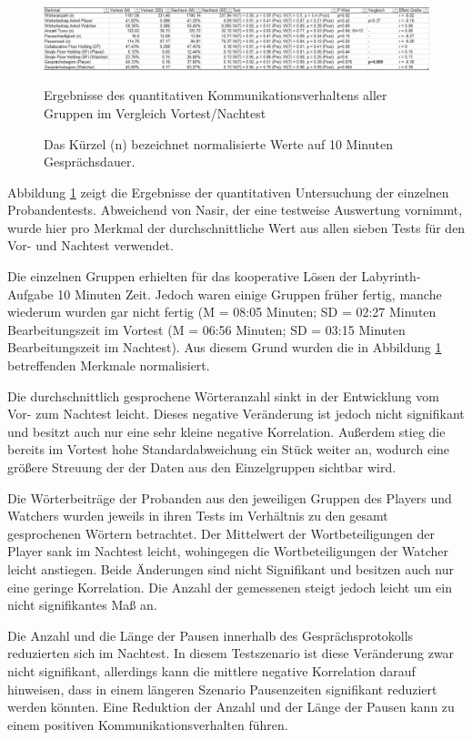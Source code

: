 \begin{figure}[ht]
\centering
\includegraphics[width=1\linewidth]{content/pictures/quantitative_communication_results.png}
\caption{Ergebnisse des quantitativen Kommunikationsverhaltens aller Gruppen im Vergleich Vortest/Nachtest}
\caption*{\footnotesize Das Kürzel (n) bezeichnet normalisierte Werte auf 10 Minuten Gesprächsdauer.}
\label{fig:communication-results}
\end{figure}

Abbildung \ref{fig:communication-results} zeigt die Ergebnisse der quantitativen Untersuchung der einzelnen Probandentests. Abweichend von Nasir, der eine testweise Auswertung vornimmt, wurde hier pro Merkmal der durchschnittliche Wert aus allen sieben Tests für den Vor- und Nachtest verwendet.

Die einzelnen Gruppen erhielten für das kooperative Lösen der Labyrinth-Aufgabe 10 Minuten Zeit. Jedoch waren einige Gruppen früher fertig, manche wiederum wurden gar nicht fertig (M = 08:05 Minuten; SD = 02:27 Minuten Bearbeitungszeit im Vortest (M = 06:56 Minuten; SD = 03:15 Minuten Bearbeitungszeit im Nachtest). Aus diesem Grund wurden die in Abbildung \ref{fig:communication-results} betreffenden Merkmale normalisiert.

Die durchschnittlich gesprochene Wörteranzahl sinkt in der Entwicklung vom Vor- zum Nachtest leicht. Dieses negative Veränderung ist jedoch nicht signifikant und besitzt auch nur eine sehr kleine negative Korrelation. Außerdem stieg die bereits im Vortest hohe Standardabweichung ein Stück weiter an, wodurch eine größere Streuung der der Daten aus den Einzelgruppen sichtbar wird. 

Die Wörterbeiträge der Probanden aus den jeweiligen Gruppen des Players und Watchers wurden jeweils in ihren Tests im Verhältnis zu den gesamt gesprochenen Wörtern betrachtet. Der Mittelwert der Wortbeteiligungen der Player sank im Nachtest leicht, wohingegen die Wortbeteiligungen der Watcher leicht anstiegen. Beide Änderungen sind nicht Signifikant und besitzen auch nur eine geringe Korrelation. Die Anzahl der gemessenen  steigt jedoch leicht um ein nicht signifikantes Maß an.

Die Anzahl und die Länge der Pausen innerhalb des Gesprächsprotokolls reduzierten sich im Nachtest. In diesem Testszenario ist diese Veränderung zwar nicht signifikant, allerdings kann die mittlere negative Korrelation darauf hinweisen, dass in einem längeren Szenario Pausenzeiten signifikant reduziert werden könnten. Eine Reduktion der Anzahl und der Länge der Pausen kann zu einem positiven Kommunikationsverhalten führen.

